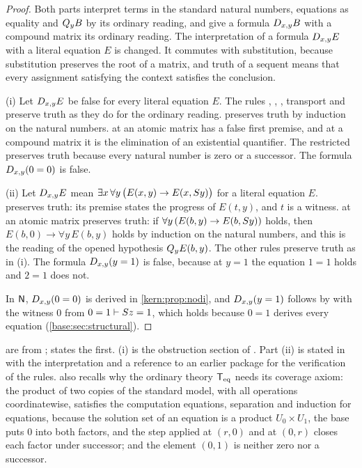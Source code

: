 \begin{proof}
Both parts interpret terms in the standard natural numbers, equations as
equality and $Q_{y}B$ by its ordinary reading, and give a formula
$D_{x,y}B$ with a compound matrix its ordinary reading.  The interpretation
of a formula $D_{x,y}E$ with a literal equation $E$ is changed.  It commutes
with substitution, because substitution preserves the root of a matrix, and
truth of a sequent means that every assignment satisfying the context
satisfies the conclusion.

(i) Let $D_{x,y}E$ be false for every literal equation $E$.  The rules
, , , transport and 
preserve truth as they do for the ordinary reading.   preserves
truth by induction on the natural numbers.   at an atomic matrix
has a false first premise, and at a compound matrix it is the elimination of
an existential quantifier.  The restricted  preserves truth
because every natural number is zero or a successor.  The formula
$D_{x,y}(0=0)$ is false.

(ii) Let $D_{x,y}E$ mean
$\exists x\,\forall y\,\bigl(E(x,y)\to E(x,S y)\bigr)$ for a literal
equation $E$.   preserves truth: its premise states the
progress of $E(t,y)$, and $t$ is a witness.   at an atomic
matrix preserves truth: if $\forall y\,(E(b,y)\to E(b,S y))$ holds, then
$E(b,0)\to\forall y\,E(b,y)$ holds by induction on the natural numbers, and
this is the reading of the opened hypothesis $Q_{y}E(b,y)$.  The other rules
preserve truth as in (i).  The formula $D_{x,y}(y=1)$ is false, because at
$y=1$ the equation $1=1$ holds and $2=1$ does not.

In $\mathsf{N}$, $D_{x,y}(0=0)$ is derived in \cref{kern:prop:nodi}, and
$D_{x,y}(y=1)$ follows by  with the witness $0$ from
$0=1\vdash S z=1$, which holds because $0=1$ derives every equation
(\cref{base:sec:structural}).
\end{proof}

\begin{remark}[Sources]
\label{kern:rem:limits-sources}
 are from
;  states the first.
(i) is the obstruction section of
.  Part (ii) is stated in
 with the interpretation and a reference to
an earlier package for the verification of the rules.
 also recalls why the ordinary theory $\mathsf{T}_{\mathrm{eq}}$
needs its coverage axiom: the product of two copies of the standard model,
with all operations coordinatewise, satisfies the computation equations,
separation and induction for equations, because the solution set of an
equation is a product $U_0\times U_1$, the base puts $0$ into both factors,
and the step applied at $(r,0)$ and at $(0,r)$ closes each factor under
successor; and the element $(0,1)$ is neither zero nor a successor.
\end{remark}

